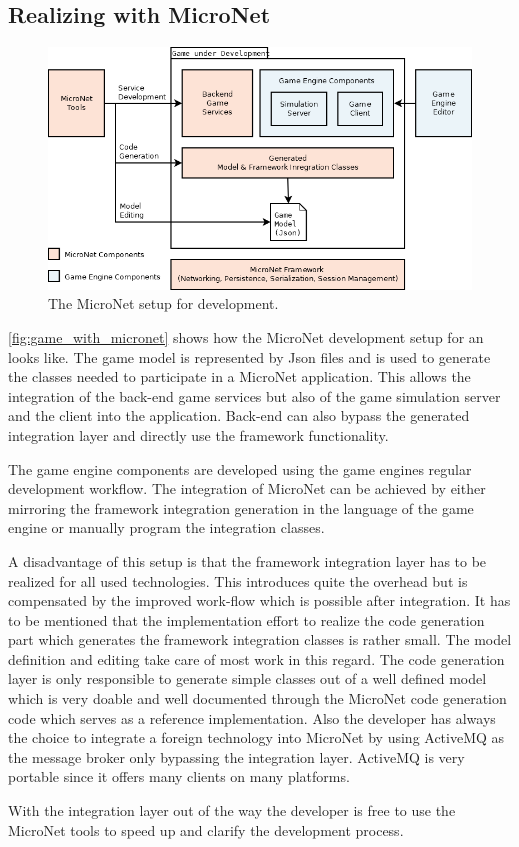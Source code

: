 \subsection{Realizing \ogs{} with MicroNet}

\begin{figure}
	\centering
	\includegraphics[width=\textwidth]{images/architecture/GameWithMicroNet}
	\caption{The MicroNet setup for \og{} development.}
	\label{fig:game_with_micronet}
\end{figure}

\autoref{fig:game_with_micronet} shows how the MicroNet development setup for an
\og{} looks like. The game model is represented by Json files and is used to generate
the classes needed to participate in a MicroNet application. This allows the
integration of the back-end game services but also of the game simulation
server and the client into the application. Back-end can also bypass the
generated integration layer and directly use the framework functionality. 

The game engine components are developed using the game engines regular
development workflow. The integration of MicroNet can be achieved by either
mirroring the framework integration generation in the language of the game
engine or manually program the integration classes.

A disadvantage of this setup is that the framework integration layer has to be
realized for all used technologies. This introduces quite the overhead but is
compensated by the improved work-flow which is possible after integration. It
has to be mentioned that the implementation effort to realize the code
generation part which generates the framework integration classes is rather
small. The model definition and editing take care of most work in this regard.
The code generation layer is only responsible to generate simple classes out of
a well defined model which is very doable and well documented through the
MicroNet code generation code which serves as a reference implementation. Also
the developer has always the choice to integrate a foreign technology into
MicroNet by using ActiveMQ as the message broker only bypassing the integration
layer. ActiveMQ is very portable since it offers many clients on many platforms. 

With the integration layer out of the way the developer is free to use the
MicroNet tools to speed up and clarify the development process.